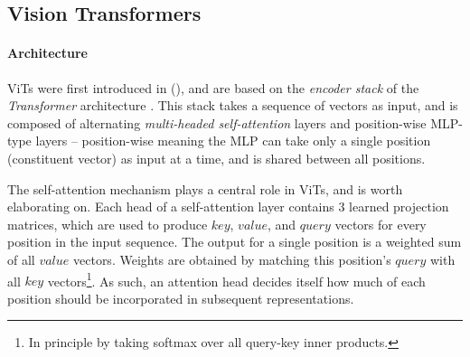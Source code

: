 

\subsection{Vision Transformers} \label{vits}
\paragraph{Architecture}
ViTs were first introduced in \citeauthor{dosovitskiy2020image} (\citeyear{dosovitskiy2020image}), and are based on the \textit{encoder stack} of the \textit{Transformer} architecture \citep{vaswani2017attention}. This stack takes a sequence of vectors as input, and is composed of alternating \textit{multi-headed self-attention} layers and position-wise MLP-type layers -- position-wise meaning the MLP can take only a single position (constituent vector) as input at a time, and is shared between all positions.

The self-attention mechanism plays a central role in ViTs, and is worth elaborating on. Each head of a self-attention layer contains 3 learned projection matrices, which are used to produce $key$, $value$, and $query$ vectors for every position in the input sequence. The output for a single position is a weighted sum of all $value$ vectors. Weights are obtained by matching this position's $query$ with all $key$ vectors\footnote{In principle by taking softmax over all query-key inner products.}. As such, an attention head decides itself how much of each position should be incorporated in subsequent representations.

